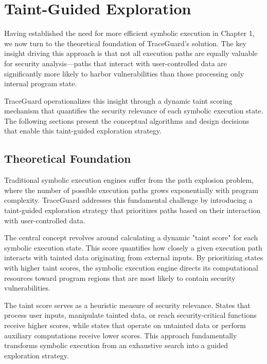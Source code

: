 \chapter{Taint-Guided Exploration}


Having established the need for more efficient symbolic execution in Chapter 1, we now turn to the theoretical foundation of TraceGuard's solution. The key insight driving this approach is that not all execution paths are equally valuable for security analysis—paths that interact with user-controlled data are significantly more likely to harbor vulnerabilities than those processing only internal program state.

TraceGuard operationalizes this insight through a dynamic taint scoring mechanism that quantifies the security relevance of each symbolic execution state. The following sections present the conceptual algorithms and design decisions that enable this taint-guided exploration strategy.

\section{Theoretical Foundation}

Traditional symbolic execution engines suffer from the path explosion problem, where the number of possible execution paths grows exponentially with program complexity. TraceGuard addresses this fundamental challenge by introducing a taint-guided exploration strategy that prioritizes paths based on their interaction with user-controlled data.

The central concept revolves around calculating a dynamic "taint score" for each symbolic execution state. This score quantifies how closely a given execution path interacts with tainted data originating from external inputs. By prioritizing states with higher taint scores, the symbolic execution engine directs its computational resources toward program regions that are most likely to contain security vulnerabilities.

The taint score serves as a heuristic measure of security relevance. States that process user inputs, manipulate tainted data, or reach security-critical functions receive higher scores, while states that operate on untainted data or perform auxiliary computations receive lower scores. This approach fundamentally transforms symbolic execution from an exhaustive search into a guided exploration strategy.

